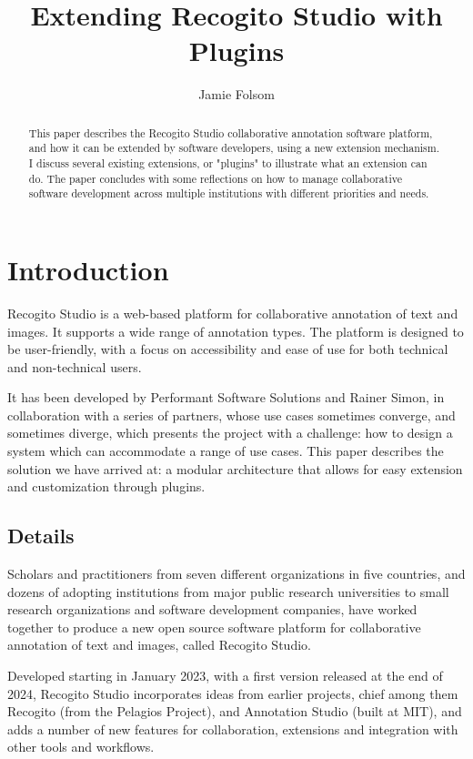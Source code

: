 \documentclass[final]{anthology-ch}         %
\title{Extending Recogito Studio with Plugins}
\author[1]{Jamie Folsom}[
  orcid=0000-0001-8963-7072
]
\affiliation{1}{Performant Software Solutions, Boston MA, United States}
\begin{document}
\maketitle

\begin{abstract}
This paper describes the Recogito Studio collaborative annotation software platform, and how it can be extended by software developers, using a new extension mechanism. I discuss several existing extensions, or "plugins" to illustrate what an extension can do.  The paper concludes with some reflections on how to manage collaborative software development across multiple institutions with different priorities and needs.
\end{abstract}

\section{Introduction} 

Recogito Studio is a web-based platform for collaborative annotation of text and images. It supports a wide range of annotation types. The platform is designed to be user-friendly, with a focus on accessibility and ease of use for both technical and non-technical users.

It has been developed by Performant Software Solutions and Rainer Simon, in collaboration with a series of partners, whose use cases sometimes converge, and sometimes diverge, which presents the project with a challenge: how to design a system which can accommodate a range of use cases. This paper describes the solution we have arrived at: a modular architecture that allows for easy extension and customization through plugins.

\subsection{Details} \label{sec:intro_details}

Scholars and practitioners from seven different organizations in five countries, and dozens of adopting institutions from major public research universities to small research organizations and software development companies, have worked together to produce a new open source software platform for collaborative annotation of text and images, called Recogito Studio.

Developed starting in January 2023, with a first version released at the end of 2024, Recogito Studio incorporates ideas from earlier projects, chief among them Recogito (from the Pelagios Project), and Annotation Studio (built at MIT), and adds a number of new features for collaboration, extensions and integration with other tools and workflows.
\end{document}
